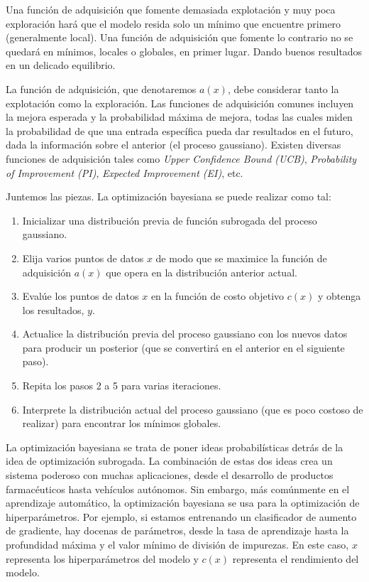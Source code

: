 \documentclass[a4paper,12pt]{article}
\begin{document}
Una función de adquisición que fomente demasiada explotación y muy poca exploración hará que el modelo resida solo un mínimo que encuentre primero (generalmente local). Una función de adquisición que fomente lo contrario no se quedará en mínimos, locales o globales, en primer lugar. Dando buenos resultados en un delicado equilibrio.

La función de adquisición, que denotaremos $a(x)$, debe considerar tanto la explotación como la exploración. Las funciones de adquisición comunes incluyen la mejora esperada y la probabilidad máxima de mejora, todas las cuales miden la probabilidad de que una entrada específica pueda dar resultados en el futuro, dada la información sobre el anterior (el proceso gaussiano). Existen diversas funciones de adquisición tales como \textit{Upper Confidence Bound (UCB)}, \textit{Probability of Improvement (PI)}, \textit{Expected Improvement (EI)}, etc. \citep{Agnihotri2020May}

Juntemos las piezas. La optimización bayesiana se puede realizar como tal:
\begin{enumerate}
	\item Inicializar una distribución previa de función subrogada del proceso gaussiano.
	\item Elija varios puntos de datos $x$ de modo que se maximice la función de adquisición $a(x)$ que opera en la distribución anterior actual.
	\item Evalúe los puntos de datos $x$ en la función de costo objetivo $c(x)$ y obtenga los resultados, $y$.
	\item Actualice la distribución previa del proceso gaussiano con los nuevos datos para producir un posterior (que se convertirá en el anterior en el siguiente paso).
	\item Repita los pasos 2 a 5 para varias iteraciones.
	\item Interprete la distribución actual del proceso gaussiano (que es poco costoso de realizar) para encontrar los mínimos globales.
\end{enumerate}

La optimización bayesiana se trata de poner ideas probabilísticas detrás de la idea de optimización subrogada. La combinación de estas dos ideas crea un sistema poderoso con muchas aplicaciones, desde el desarrollo de productos farmacéuticos hasta vehículos autónomos. Sin embargo, más comúnmente en el aprendizaje automático, la optimización bayesiana se usa para la optimización de hiperparámetros. Por ejemplo, si estamos entrenando un clasificador de aumento de gradiente, hay docenas de parámetros, desde la tasa de aprendizaje hasta la profundidad máxima y el valor mínimo de división de impurezas. En este caso, $x$ representa los hiperparámetros del modelo y $c(x)$ representa el rendimiento del modelo.
\end{document}
